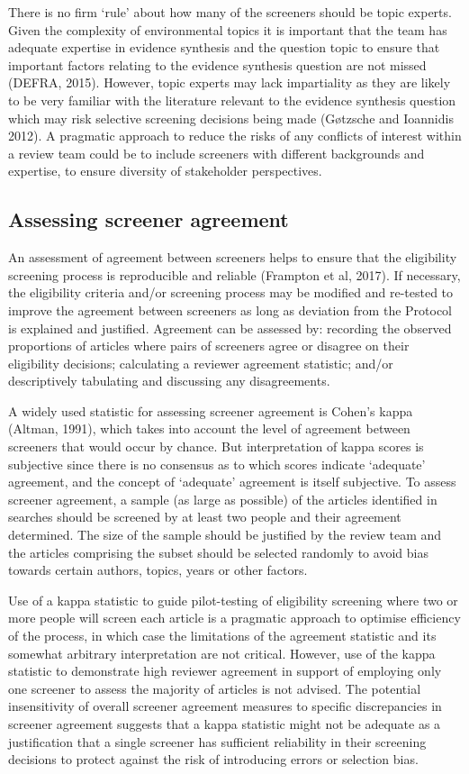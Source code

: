 \documentclass[
  letterpaper,
  DIV=11,
  numbers=noendperiod]{scrreprt}
\begin{document}
There is no firm `rule' about how many of the screeners should be topic
experts. Given the complexity of environmental topics it is important
that the team has adequate expertise in evidence synthesis and the
question topic to ensure that important factors relating to the evidence
synthesis question are not missed (DEFRA, 2015). However, topic experts
may lack impartiality as they are likely to be very familiar with the
literature relevant to the evidence synthesis question which may risk
selective screening decisions being made (Gøtzsche and Ioannidis 2012).
A pragmatic approach to reduce the risks of any conflicts of interest
within a review team could be to include screeners with different
backgrounds and expertise, to ensure diversity of stakeholder
perspectives.

\subsection{Assessing screener
agreement}\label{assessing-screener-agreement-1}

An assessment of agreement between screeners helps to ensure that the
eligibility screening process is reproducible and reliable (Frampton et
al, 2017). If necessary, the eligibility criteria and/or screening
process may be modified and re-tested to improve the agreement between
screeners as long as deviation from the Protocol is explained and
justified. Agreement can be assessed by: recording the observed
proportions of articles where pairs of screeners agree or disagree on
their eligibility decisions; calculating a reviewer agreement statistic;
and/or descriptively tabulating and discussing any disagreements.

A widely used statistic for assessing screener agreement is Cohen's
kappa (Altman, 1991), which takes into account the level of agreement
between screeners that would occur by chance. But interpretation of
kappa scores is subjective since there is no consensus as to which
scores indicate `adequate' agreement, and the concept of `adequate'
agreement is itself subjective. To assess screener agreement, a sample
(as large as possible) of the articles identified in searches should be
screened by at least two people and their agreement determined. The size
of the sample should be justified by the review team and the articles
comprising the subset should be selected randomly to avoid bias towards
certain authors, topics, years or other factors.

Use of a kappa statistic to guide pilot-testing of eligibility screening
where two or more people will screen each article is a pragmatic
approach to optimise efficiency of the process, in which case the
limitations of the agreement statistic and its somewhat arbitrary
interpretation are not critical. However, use of the kappa statistic to
demonstrate high reviewer agreement in support of employing only one
screener to assess the majority of articles is not advised. The
potential insensitivity of overall screener agreement measures to
specific discrepancies in screener agreement suggests that a kappa
statistic might not be adequate as a justification that a single
screener has sufficient reliability in their screening decisions to
protect against the risk of introducing errors or selection bias.
\end{document}
